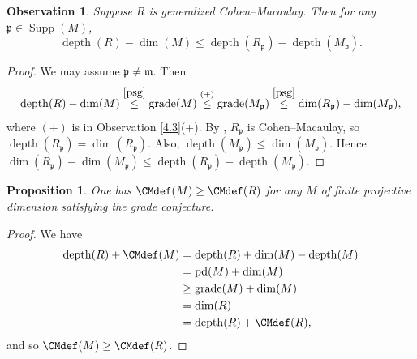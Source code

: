 \documentclass[11.05pt,a4paper]{amsart}
\newtheorem{proposition}[theorem]{Proposition}
\newtheorem{observation}[theorem]{Observation}\newcommand{\up}[1]{{{}^{#1}\!}}
\theoremstyle{definition}
\theoremstyle{remark}
\newcommand{\grade}{\operatorname{grade}}
\newcommand{\pd}{\operatorname{pd}}
\newcommand{\Supp}{\operatorname{Supp}}
\newcommand{\depth}{\operatorname{depth}}
\begin{document}
 



\begin{observation}
	Suppose $R$ is generalized Cohen–Macaulay. Then for any $\mathfrak{p} \in \Supp(M)$,
	\[
	\depth(R) - \dim (M )\leq \depth(R_{\mathfrak{p}}) - \depth(M_{\mathfrak{p}}).
	\]
\end{observation}

\begin{proof}
	We may assume $\mathfrak{p} \neq \mathfrak{m}$. Then
	\[
	\depth(R) - \dim (M) \stackrel{\ref{psg}}\leq \grade(M) \stackrel{(+)}\leq \grade(M_{\mathfrak{p}})\stackrel{\ref{psg}} \leq \dim (R_{\mathfrak{p}}) - \dim (M_{\mathfrak{p}}),
	\]where $(+)$  is in Observation \ref{4.3}(+).
	By   \cite[Exercise 9.5.7]{BSh}, $R_{\mathfrak{p}}$ is Cohen–Macaulay, so $\depth(R_{\mathfrak{p}}) = \dim (R_{\mathfrak{p}})$. Also, $\depth(M_{\mathfrak{p}}) \leq \dim( M_{\mathfrak{p}})$. Hence
	\(
	\dim (R_{\mathfrak{p}}) - \dim (M_{\mathfrak{p}}) \leq \depth(R_{\mathfrak{p}}) - \depth(M_{\mathfrak{p}}).
	\)
\end{proof}


\begin{proposition}\label{pdef}
One has  $\CMdef(M)\geq \CMdef(R)$ for any $M$ of finite projective dimension satisfying the grade conjecture.
\end{proposition}
\begin{proof}
We have\begin{align*}	\depth(R)+\CMdef(M)
&= \depth(R)+\dim(M)-\depth(M) \\
&=\pd(M)+\dim(M)\\
&\geq  \grade(M)+\dim(M)\\
&=\dim(R) \\
&=\depth(R)+\CMdef(R),
\end{align*}
and so $\CMdef(M)\geq \CMdef(R)$.
\end{proof}
\end{document}
